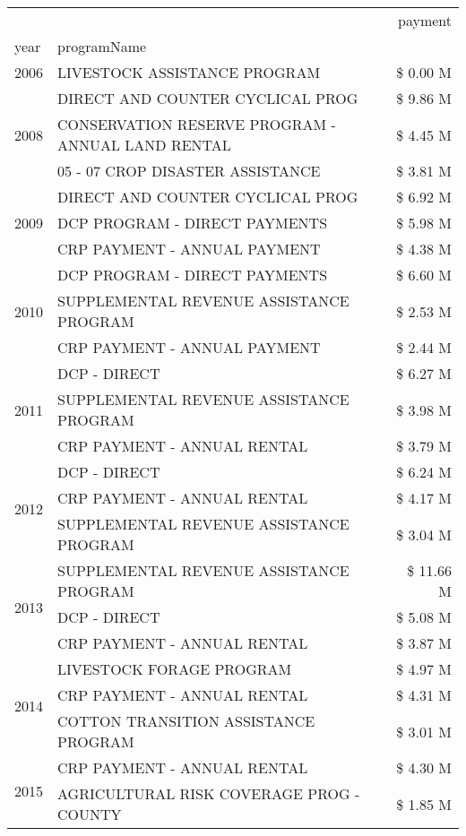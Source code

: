 \begin{tabular}{llr}
\toprule
 &  & payment \\
year & programName &  \\
\midrule
2006 & LIVESTOCK ASSISTANCE PROGRAM & \$ 0.00 M \\
\cline{1-3}
\multirow[t]{3}{*}{2008} & DIRECT AND COUNTER CYCLICAL PROG & \$ 9.86 M \\
 & CONSERVATION RESERVE PROGRAM - ANNUAL LAND RENTAL & \$ 4.45 M \\
 & 05 - 07 CROP DISASTER ASSISTANCE & \$ 3.81 M \\
\cline{1-3}
\multirow[t]{3}{*}{2009} & DIRECT AND COUNTER CYCLICAL PROG & \$ 6.92 M \\
 & DCP PROGRAM - DIRECT PAYMENTS & \$ 5.98 M \\
 & CRP PAYMENT - ANNUAL PAYMENT & \$ 4.38 M \\
\cline{1-3}
\multirow[t]{3}{*}{2010} & DCP PROGRAM - DIRECT PAYMENTS & \$ 6.60 M \\
 & SUPPLEMENTAL REVENUE ASSISTANCE PROGRAM & \$ 2.53 M \\
 & CRP PAYMENT - ANNUAL PAYMENT & \$ 2.44 M \\
\cline{1-3}
\multirow[t]{3}{*}{2011} & DCP - DIRECT & \$ 6.27 M \\
 & SUPPLEMENTAL REVENUE ASSISTANCE PROGRAM & \$ 3.98 M \\
 & CRP PAYMENT - ANNUAL RENTAL & \$ 3.79 M \\
\cline{1-3}
\multirow[t]{3}{*}{2012} & DCP - DIRECT & \$ 6.24 M \\
 & CRP PAYMENT - ANNUAL RENTAL & \$ 4.17 M \\
 & SUPPLEMENTAL REVENUE ASSISTANCE PROGRAM & \$ 3.04 M \\
\cline{1-3}
\multirow[t]{3}{*}{2013} & SUPPLEMENTAL REVENUE ASSISTANCE PROGRAM & \$ 11.66 M \\
 & DCP - DIRECT & \$ 5.08 M \\
 & CRP PAYMENT - ANNUAL RENTAL & \$ 3.87 M \\
\cline{1-3}
\multirow[t]{3}{*}{2014} & LIVESTOCK FORAGE PROGRAM & \$ 4.97 M \\
 & CRP PAYMENT - ANNUAL RENTAL & \$ 4.31 M \\
 & COTTON TRANSITION ASSISTANCE PROGRAM & \$ 3.01 M \\
\cline{1-3}
\multirow[t]{3}{*}{2015} & CRP PAYMENT - ANNUAL RENTAL & \$ 4.30 M \\
 & AGRICULTURAL RISK COVERAGE PROG - COUNTY & \$ 1.85 M \\

\end{tabular}
